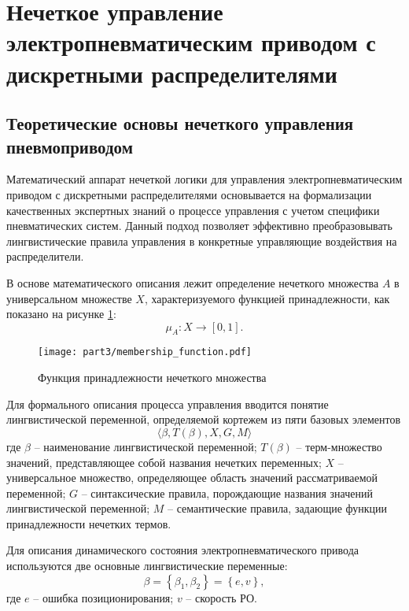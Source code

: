 \section{Нечеткое управление электропневматическим приводом с дискретными распределителями}\label{sec:ch3/sec4}
\subsection{Теоретические основы нечеткого управления пневмоприводом}\label{subsec:ch3/sec4/sub1}

Математический аппарат нечеткой логики для управления электропневматическим приводом
с дискретными распределителями основывается на формализации качественных экспертных знаний
о процессе управления с учетом специфики пневматических систем. Данный подход позволяет эффективно
преобразовывать лингвистические правила управления в конкретные управляющие воздействия на распределители.

В основе математического описания лежит определение нечеткого множества $A$ в
универсальном множестве $X$, характеризуемого
функцией принадлежности, как показано на рисунке \ref{fig:membership_functions}:
\begin{equation}
	\mu_A: X \rightarrow \left[0,1\right].
\end{equation}

\begin{figure}[ht]
	\centering
	\texttt{[image: part3/membership\_function.pdf]}
	\caption{Функция принадлежности нечеткого множества}
	\label{fig:membership_functions}
\end{figure}

Для формального описания процесса управления вводится понятие лингвистической переменной,
определяемой кортежем из пяти базовых элементов
\begin{equation}
	\langle \beta, T(\beta), X, G, M \rangle
\end{equation}
где $\beta$ -- наименование лингвистической переменной;
$T(\beta)$ -- терм-множество значений, представляющее собой названия нечетких переменных;
$X$ -- универсальное множество, определяющее область значений рассматриваемой переменной;
$G$ -- синтаксические правила, порождающие названия значений лингвистической переменной;
$M$ -- семантические правила, задающие функции принадлежности нечетких термов.

Для описания динамического состояния электропневматического привода
используются две основные лингвистические переменные:
\begin{equation}
	\beta = \left\{\beta_1, \beta_2\right\} = \left\{e, v\right\},
\end{equation}
где $e$ -- ошибка позиционирования;
$v$ -- скорость РО.

